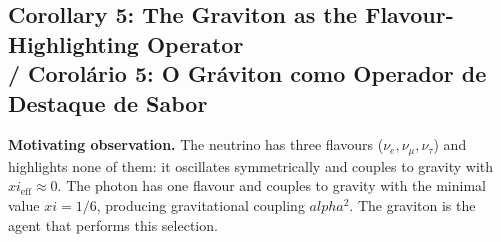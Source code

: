 \documentclass[12pt,a4paper]{article}
\def\alpha{alpha}%
\def\xi{xi}%
\begin{document}
\subsection{Corollary 5: The Graviton as the Flavour-Highlighting Operator \\ / Corolário 5: O Gráviton como Operador de Destaque de Sabor}
\label{cor:flavour}

\noindent\textbf{Motivating observation.} The neutrino has three flavours ($\nu_e, \nu_\mu, \nu_\tau$) and highlights none of them: it oscillates symmetrically and couples to gravity with $\xi_{\text{eff}} \approx 0$. The photon has one flavour and couples to gravity with the minimal value $\xi = 1/6$, producing gravitational coupling $\alpha^2$. The graviton is the agent that performs this selection.
\end{document}
